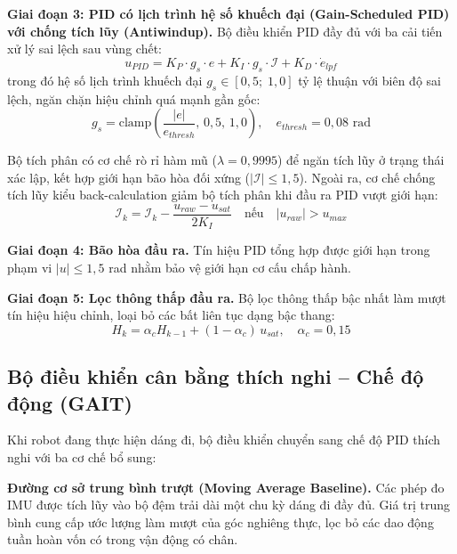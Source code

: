 \textbf{Giai đoạn 3: PID có lịch trình hệ số khuếch đại (Gain-Scheduled PID) với chống tích lũy (Antiwindup).}
Bộ điều khiển PID đầy đủ \cite{astrom2006} với ba cải tiến xử lý sai lệch sau vùng chết:
\begin{equation}
    u_{PID} = K_P \cdot g_s \cdot e + K_I \cdot g_s \cdot \mathcal{I} + K_D \cdot \dot{e}_{lpf}
\end{equation}
trong đó hệ số lịch trình khuếch đại $g_s \in [0{,}5;\; 1{,}0]$ tỷ lệ thuận với biên độ sai lệch, ngăn chặn hiệu chỉnh quá mạnh gần gốc:
\begin{equation}
    g_s = \text{clamp}\!\left(
    \frac{|e|}{e_{thresh}},\, 0{,}5,\, 1{,}0
    \right), \quad e_{thresh} = 0{,}08 \text{ rad}
\end{equation}

Bộ tích phân có cơ chế rò rỉ hàm mũ ($\lambda = 0{,}9995$) để ngăn tích lũy ở trạng thái xác lập, kết hợp giới hạn bão hòa đối xứng ($|\mathcal{I}| \leq 1{,}5$). Ngoài ra, cơ chế chống tích lũy kiểu back-calculation giảm bộ tích phân khi đầu ra PID vượt giới hạn:
\begin{equation}
    \mathcal{I}_{k} = \mathcal{I}_{k} -
    \frac{u_{raw} - u_{sat}}{2 K_I}
    \quad \text{nếu} \quad |u_{raw}| > u_{max}
\end{equation}

\textbf{Giai đoạn 4: Bão hòa đầu ra.}
Tín hiệu PID tổng hợp được giới hạn trong phạm vi $|u| \leq 1{,}5$ rad nhằm bảo vệ giới hạn cơ cấu chấp hành.

\textbf{Giai đoạn 5: Lọc thông thấp đầu ra.}
Bộ lọc thông thấp bậc nhất làm mượt tín hiệu hiệu chỉnh, loại bỏ các bất liên tục dạng bậc thang:
\begin{equation}
    H_{k} = \alpha_c H_{k-1} + (1 - \alpha_c)\, u_{sat}, \quad \alpha_c = 0{,}15
\end{equation}

\subsection{Bộ điều khiển cân bằng thích nghi -- Chế độ động (GAIT)}

Khi robot đang thực hiện dáng đi, bộ điều khiển chuyển sang chế độ PID thích nghi với ba cơ chế bổ sung:

\textbf{Đường cơ sở trung bình trượt (Moving Average Baseline).}
Các phép đo IMU được tích lũy vào bộ đệm trải dài một chu kỳ dáng đi đầy đủ. Giá trị trung bình cung cấp ước lượng làm mượt của góc nghiêng thực, lọc bỏ các dao động tuần hoàn vốn có trong vận động có chân.

